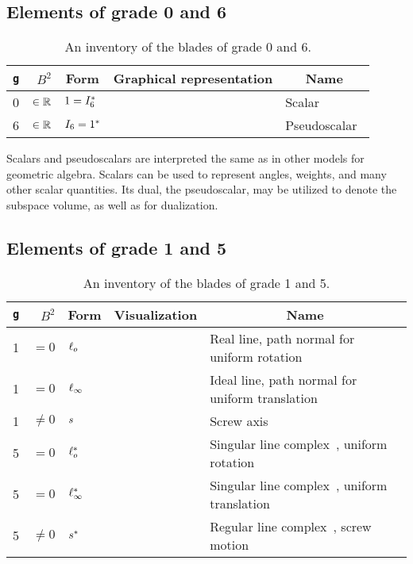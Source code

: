 \subsection{Elements of grade 0 and 6}
\begin{table}
  \caption{An inventory of the blades of grade 0 and 6.}
  \label{tab:inv0}
  \begin{tabular}{|c|r|l|c|l|}
    \hline
    \multicolumn{1}{|c|}{\texttt{g}} & $B^2$ & \multicolumn{1}{|c|}{Form} & \multicolumn{1}{|c|}{Graphical representation} & \multicolumn{1}{|c|}{Name} \\ \hline
    \hline
    0 & $\in \mathbb{R}$ & $1 = I_6^\ast$ & & Scalar~\cite{TheBook} \\ \hline
    6 & $\in \mathbb{R}$ & $I_6 = 1^\ast$ & & Pseudoscalar~\cite{TheBook} \\ \hline
  \end{tabular}
\end{table}

Scalars and pseudoscalars are interpreted the same as in other models for geometric algebra.  Scalars can be used to represent angles, weights, and many other scalar quantities.  Its dual, the pseudoscalar, may be utilized to denote the subspace volume, as well as for dualization.


\subsection{Elements of grade 1 and 5}
\begin{table}
  \caption{An inventory of the blades of grade 1 and 5.  
    }
  \label{tab:inv1}
  \begin{tabular}{|c|r|p{2.7cm}|p{2cm}|p{5cm}|}
    \hline
    \multicolumn{1}{|c|}{\texttt{g}} & $B^2$ & \multicolumn{1}{|c|}{Form} & \multicolumn{1}{|c|}{Visualization} & \multicolumn{1}{|c|}{Name} \\ \hline
    \hline
    1 & $= 0$ & $\ell_o$ & & Real line, path normal for uniform rotation\\ \hline
    1 & $= 0$ & $\ell_\infty$ & & Ideal line, path normal for uniform translation\\ \hline
    1 & $\not= 0$ & $s$ & & Screw axis \\ \hline
    5 & $= 0$ & $\ell_o^\ast$ & & Singular line complex~\cite{Pottmann}, uniform rotation \\ \hline
    5 & $= 0$ & $\ell_\infty^\ast$ & & Singular line complex~\cite{Pottmann}, uniform translation \\ \hline
    5 & $\not= 0$ & $s^\ast$ & & Regular line complex~\cite{Pottmann}, screw motion \\ \hline
  \end{tabular}
\end{table}

